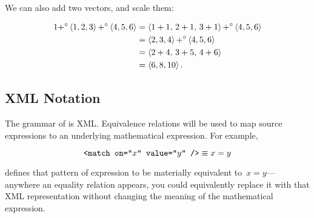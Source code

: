 We can also add two vectors, and scale them:

\begin{align*}
  1 {+}^\circ \left\langle1,2,3\right\rangle {+}^\circ \left\langle4,5,6\right\rangle
    &= \left\langle1+1,\, 2+1,\, 3+1\right\rangle {+}^\circ \left\langle4,5,6\right\rangle \\
    &= \left\langle2,3,4\right\rangle {+}^\circ \left\langle4,5,6\right\rangle \\
    &= \left\langle2+4,\, 3+5,\, 4+6\right\rangle \\
    &= \left\langle6, 8, 10\right\rangle.
\end{align*}


\subsection{XML Notation}
The grammar of \tame{} is XML.
Equivalence relations will be used to map source expressions to an
  underlying mathematical expression.
For example,

\begin{equation*}
  \texttt{<match on="$x$" value="$y$" />} \equiv x = y
\end{equation*}

\noindent
defines that pattern of  expression to be materially
  equivalent to~$x=y$---%
    anywhere an equality relation appears,
      you could equivalently replace it with that XML representation without
        changing the meaning of the mathematical expression.
